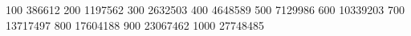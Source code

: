  100 386612
 200 1197562
 300 2632503
 400 4648589
 500 7129986
 600 10339203
 700 13717497
 800 17604188
 900 23067462
 1000 27748485
